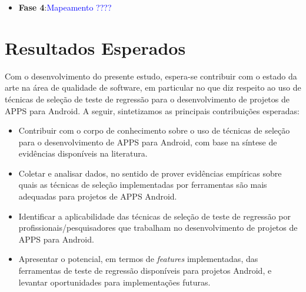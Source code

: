 \begin{itemize}
  \item \textbf{Fase 4}:\textcolor{blue}{Mapeamento ????} 
  
  
\end{itemize}

\section{Resultados Esperados}\label{sec:resultadosesperados}


Com o desenvolvimento do presente estudo, espera-se contribuir com o estado da arte na área de qualidade de software, em particular no que diz respeito ao uso de técnicas de seleção de teste de regressão para o desenvolvimento de projetos de \ac{APPS} para Android. A seguir, sintetizamos as principais contribuições esperadas: 


\begin{itemize}

    \item Contribuir com o corpo de conhecimento sobre o uso de técnicas de seleção para o desenvolvimento de \ac{APPS} para Android, com base na síntese de evidências disponíveis na literatura.
    
    \item Coletar e analisar dados, no sentido de prover evidências empíricas sobre quais as técnicas de seleção implementadas por ferramentas são mais adequadas para projetos de \ac{APPS} Android.
    
    \item Identificar a aplicabilidade das técnicas de seleção de teste de regressão por profissionais/pesquisadores que trabalham no desenvolvimento de projetos de \ac{APPS} para Android.
    
    \item Apresentar o potencial, em termos de \textit{features} implementadas, das ferramentas de teste de regressão disponíveis para projetos Android, e levantar oportunidades para implementações futuras.

\end{itemize}


